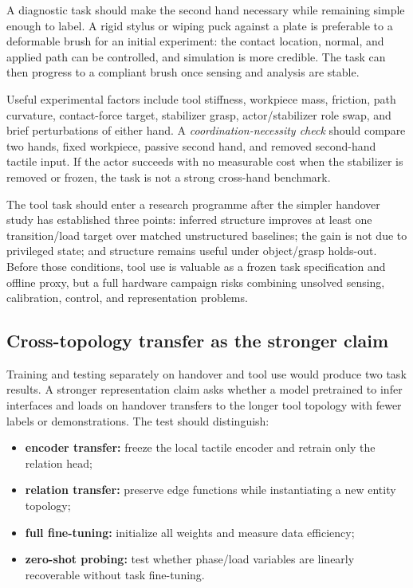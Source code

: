 A diagnostic task should make the second hand necessary while remaining simple
enough to label. A rigid stylus or wiping puck against a plate is preferable to a
deformable brush for an initial experiment: the contact location, normal, and
applied path can be controlled, and simulation is more credible. The task can
then progress to a compliant brush once sensing and analysis are stable.

Useful experimental factors include tool stiffness, workpiece mass, friction,
path curvature, contact-force target, stabilizer grasp, actor/stabilizer role
swap, and brief perturbations of either hand. A \emph{coordination-necessity
check} should compare two hands, fixed workpiece, passive second hand, and removed
second-hand tactile input. If the actor succeeds with no measurable cost when the
stabilizer is removed or frozen, the task is not a strong cross-hand benchmark.

The tool task should enter a research programme after the simpler handover study
has established three points: inferred structure improves at least one
transition/load target over matched unstructured baselines; the gain is not due
to privileged state; and structure remains useful under object/grasp holds-out.
Before those conditions, tool use is valuable as a frozen task specification and
offline proxy, but a full hardware campaign risks combining unsolved sensing,
calibration, control, and representation problems.

\subsection{Cross-topology transfer as the stronger claim}

Training and testing separately on handover and tool use would produce two task
results. A stronger representation claim asks whether a model pretrained to infer
interfaces and loads on handover transfers to the longer tool topology with
fewer labels or demonstrations. The test should distinguish:

\begin{itemize}
  \item \textbf{encoder transfer:} freeze the local tactile encoder and retrain
  only the relation head;
  \item \textbf{relation transfer:} preserve edge functions while instantiating a
  new entity topology;
  \item \textbf{full fine-tuning:} initialize all weights and measure data
  efficiency;
  \item \textbf{zero-shot probing:} test whether phase/load variables are linearly
  recoverable without task fine-tuning.
\end{itemize}

